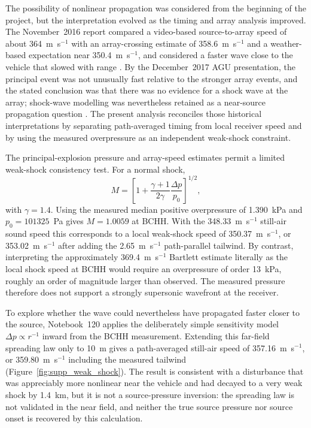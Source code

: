 \documentclass[]{seismica}
\begin{document}
The possibility of nonlinear propagation was considered from the beginning
of the project, but the interpretation evolved as the timing and array
analysis improved. The November~2016 report compared a video-based
source-to-array speed of about 364~m~s$^{-1}$ with an array-crossing estimate
of 358.6~m~s$^{-1}$ and a weather-based expectation near 350.4~m~s$^{-1}$,
and considered a faster wave close to the vehicle that slowed with range
\citep{thompson_mcnutt_fireball_2016}. By the December~2017 AGU presentation,
the principal event was not unusually fast relative to the stronger array
events, and the stated conclusion was that there was no evidence for a shock
wave at the array; shock-wave modelling was nevertheless retained as a
near-source propagation question \citep{thompson_agu_falcon9_2017}. The
present analysis reconciles those historical interpretations by separating
path-averaged timing from local receiver speed and by using the measured
overpressure as an independent weak-shock constraint.

The principal-explosion pressure and array-speed estimates permit a limited
weak-shock consistency test. For a normal shock,
\begin{equation}
 M=\left[1+\frac{\gamma+1}{2\gamma}\frac{\Delta p}{p_0}\right]^{1/2},
\end{equation}
with $\gamma=1.4$. Using the measured median positive overpressure of
1.390~kPa and $p_0=101325$~Pa gives $M=1.0059$ at BCHH. With the
348.33~m~s$^{-1}$ still-air sound speed this corresponds to a local weak-shock
speed of 350.37~m~s$^{-1}$, or 353.02~m~s$^{-1}$ after adding the
2.65~m~s$^{-1}$ path-parallel tailwind. By contrast, interpreting the
approximately 369.4~m~s$^{-1}$ Bartlett estimate literally as the local shock
speed at BCHH would require an overpressure of order 13~kPa, roughly an order
of magnitude larger than observed. The measured pressure therefore does not
support a strongly supersonic wavefront at the receiver.

To explore whether the wave could nevertheless have propagated faster closer
to the source, Notebook~120 applies the deliberately simple sensitivity model
$\Delta p\propto r^{-1}$ inward from the BCHH measurement. Extending this
far-field spreading law only to 10~m gives a path-averaged still-air speed of
357.16~m~s$^{-1}$, or 359.80~m~s$^{-1}$ including the measured tailwind
(Figure~\ref{fig:supp_weak_shock}). The result is consistent with a disturbance
that was appreciably more nonlinear near the vehicle and had decayed to a very
weak shock by 1.4~km, but it is not a source-pressure inversion: the spreading
law is not validated in the near field, and neither the true source pressure
nor source onset is recovered by this calculation.
\end{document}
